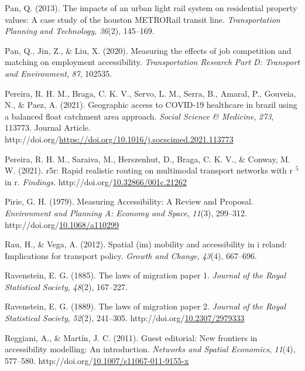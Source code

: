 \documentclass[
11pt, %
oneside, %
english, %
singlespacing, %
]{macthesis} %
\newlength{\cslhangindent}
\newenvironment{CSLReferences}[2] %
{\begin{list}{}{%
	\setlength{\itemindent}{0pt}
	\setlength{\leftmargin}{0pt}
	\setlength{\parsep}{0pt}
	\ifodd #1
	\setlength{\leftmargin}{\cslhangindent}
	\setlength{\itemindent}{-1\cslhangindent}
	\fi
	\setlength{\itemsep}{#2\baselineskip}}}
{\end{list}}
\begin{document}
\begin{CSLReferences}{1}{0}
Pan, Q. (2013). The impacts of an urban light rail system on residential property values: A case study of the houston METRORail transit line. \emph{Transportation Planning and Technology}, \emph{36}(2), 145--169.

Pan, Q., Jin, Z., \& Liu, X. (2020). Measuring the effects of job competition and matching on employment accessibility. \emph{Transportation Research Part D: Transport and Environment}, \emph{87}, 102535.

Pereira, R. H. M., Braga, C. K. V., Servo, L. M., Serra, B., Amaral, P., Gouveia, N., \& Paez, A. (2021). Geographic access to COVID-19 healthcare in brazil using a balanced float catchment area approach. \emph{Social Science \& Medicine}, \emph{273}, 113773. Journal Article. http://doi.org/\url{https://doi.org/10.1016/j.socscimed.2021.113773}

Pereira, R. H. M., Saraiva, M., Herszenhut, D., Braga, C. K. V., \& Conway, M. W. (2021). r5r: Rapid realistic routing on multimodal transport networks with r \(^{\textrm{5}}\) in r. \emph{Findings}. http://doi.org/\href{https://doi.org/10.32866/001c.21262}{10.32866/001c.21262}

Pirie, G. H. (1979). Measuring {Accessibility}: {A} {Review} and {Proposal}. \emph{Environment and Planning A: Economy and Space}, \emph{11}(3), 299--312. http://doi.org/\href{https://doi.org/10.1068/a110299}{10.1068/a110299}

Rau, H., \& Vega, A. (2012). Spatial (im) mobility and accessibility in i reland: Implications for transport policy. \emph{Growth and Change}, \emph{43}(4), 667--696.

Ravenstein, E. G. (1885). The laws of migration paper 1. \emph{Journal of the Royal Statistical Society}, \emph{48}(2), 167--227.

Ravenstein, E. G. (1889). The laws of migration paper 2. \emph{Journal of the Royal Statistical Society}, \emph{52}(2), 241--305. http://doi.org/\href{https://doi.org/10.2307/2979333}{10.2307/2979333}

Reggiani, A., \& Martín, J. C. (2011). Guest editorial: New frontiers in accessibility modelling: An introduction. \emph{Networks and Spatial Economics}, \emph{11}(4), 577--580. http://doi.org/\href{https://doi.org/10.1007/s11067-011-9155-x}{10.1007/s11067-011-9155-x}


\end{CSLReferences}
\end{document}
